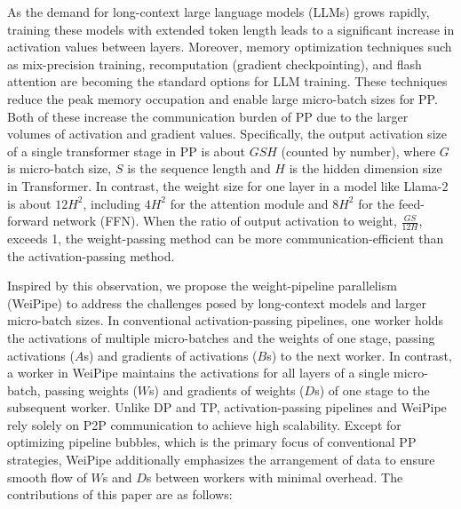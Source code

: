 \documentclass[sigplan,screen]{acmart}
\begin{document}
As the demand for long-context large language models (LLMs) grows rapidly, training these models with extended token length leads to a significant increase in activation values between layers. Moreover, memory optimization techniques such as mix-precision training\cite{micikevicius2018mixedprecisiontraining}, recomputation (gradient checkpointing), and flash attention are becoming the standard options for LLM training. These techniques reduce the peak memory occupation and enable large micro-batch sizes for PP. Both of these increase the communication burden of PP due to the larger volumes of activation and gradient values. Specifically, the output activation size of a single transformer stage in PP is about $GSH$ (counted by number), where $G$ is micro-batch size, $S$ is the sequence length and $H$ is the hidden dimension size in Transformer. In contrast, the weight size for one layer in a model like Llama-2 is about $12H^2$, including $4H^2$ for the attention module and $8H^2$ for the feed-forward network (FFN). When the ratio of output activation to weight, $\frac{GS}{12H}$, exceeds 1, the weight-passing method can be more communication-efficient than the activation-passing method.

Inspired by this observation, we propose the weight-pipeline parallelism (WeiPipe) to address the challenges posed by long-context models and larger micro-batch sizes. In conventional activation-passing pipelines, one worker holds the activations of multiple micro-batches and the weights of one stage, passing activations ($A$s) and gradients of activations ($B$s) to the next worker. In contrast, a worker in WeiPipe maintains the activations for all layers of a single micro-batch, passing weights ($W$s) and gradients of weights ($D$s) of one stage to the subsequent worker. Unlike DP and TP, activation-passing pipelines and WeiPipe rely solely on P2P communication to achieve high scalability. Except for optimizing pipeline bubbles, which is the primary focus of conventional PP strategies, WeiPipe additionally emphasizes the arrangement of data to ensure smooth flow of $W$s and $D$s between workers with minimal overhead. The contributions of this paper are as follows:
\end{document}
